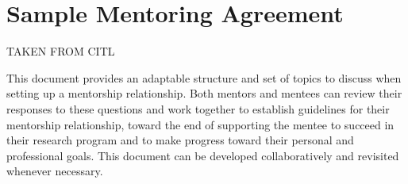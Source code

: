 \documentclass[fleqn,10pt]{wlscirep}
\begin{document}
\newpage








\newpage
\section{Sample Mentoring Agreement}

TAKEN FROM CITL

This document provides an adaptable structure and set of topics to discuss when setting up a mentorship relationship. Both mentors and mentees can review their responses to these questions and work together to establish guidelines for their mentorship relationship, toward the end of supporting the mentee to succeed in their research program and to make progress toward their personal and professional goals. This document can be developed collaboratively and revisited whenever necessary.
\end{document}
